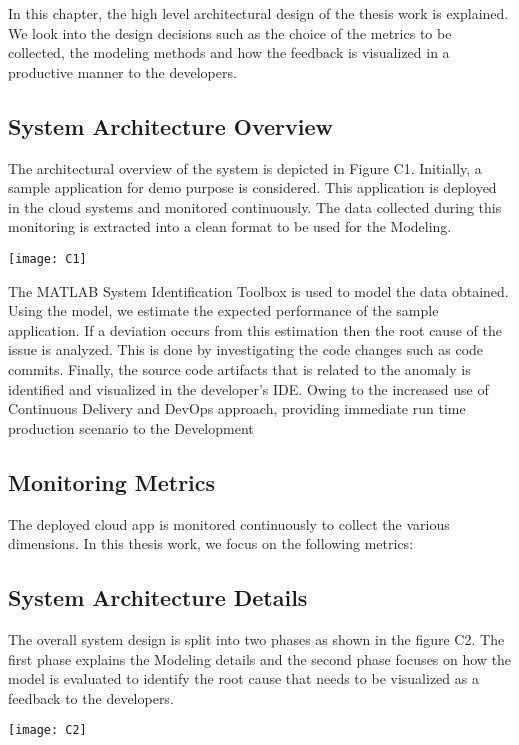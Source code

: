 \documentclass[article,type=msc,colorback,12pt,accentcolor=tud7b]{tudthesis}
\begin{document}
	In this chapter, the high level architectural design of the thesis work is explained. We look into the design decisions such as the choice of the metrics to be collected, the modeling methods and how the feedback is visualized in a productive manner to the developers.
 
\subsection{System Architecture Overview} 

	The architectural overview of the system is depicted in Figure C1. Initially,  a sample application for demo purpose is considered. This application is deployed in the cloud systems and monitored continuously. The data collected during this monitoring is extracted into a clean format to be used for the Modeling.
	
	\texttt{[image: C1]} 
	
The MATLAB System Identification Toolbox is used to model the data obtained. Using the model, we estimate the expected performance of the sample application. If a deviation occurs from this estimation then the root cause of the issue is analyzed. This is done by investigating the code changes such as code commits. Finally, the source code artifacts that is related to the anomaly is identified and visualized in the developer's IDE. Owing to the increased use of Continuous Delivery and DevOps approach, providing immediate run time production scenario to the Development 

\subsection{Monitoring Metrics} 

The deployed cloud app is monitored continuously to collect the various dimensions. In this thesis work, we focus on the following metrics:

 
 \subsection{System Architecture Details}
 	The overall system design is split into two phases as shown in the figure C2. The first phase explains the Modeling details and the second phase focuses on how the model is evaluated to identify the root cause that needs to be visualized as a feedback to the developers.
 	
\texttt{[image: C2]} 	
 	
\end{document}
